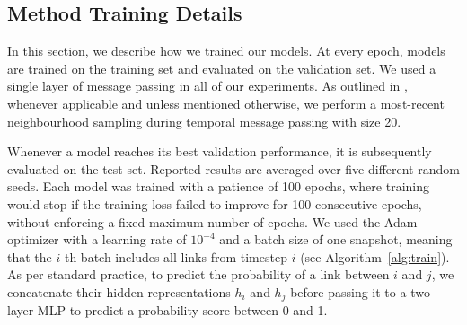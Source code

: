 \subsection{Method Training Details}

 In this section, we describe how we trained our models. At every epoch, models are trained on the training set and evaluated on the validation set. We used a single layer of message passing in all of our experiments. As outlined in , whenever applicable and unless mentioned otherwise, we perform a most-recent neighbourhood sampling during temporal message passing with size 20. 

Whenever a model reaches its best validation performance, it is subsequently evaluated on the test set. Reported results are averaged over five different random seeds. Each model was trained with a patience of 100 epochs, where training would stop if the training loss failed to improve for 100 consecutive epochs, without enforcing a fixed maximum number of epochs. We used the Adam optimizer with a learning rate of $10^{-4}$ and a batch size of one snapshot, meaning that the $i$-th batch includes all links from timestep $i$ (see Algorithm~\ref{alg:train}). As per standard practice, to predict the probability of a link between $i$ and $j$, we concatenate their hidden representations $h_i$ and $h_j$ before passing it to a two-layer MLP to predict a probability score between 0 and 1. 

